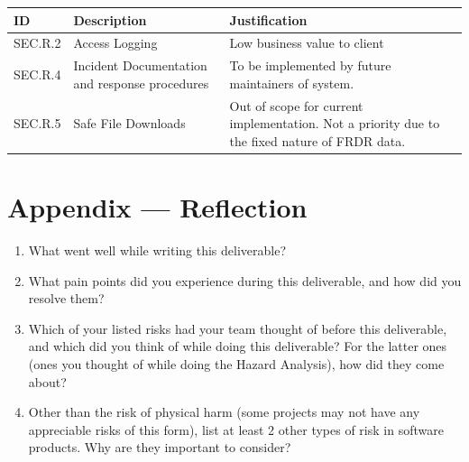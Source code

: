 \documentclass{article}
\begin{document}
\begin{table}[h!]
\begin{tabularx}{\textwidth}{ l X X } 
    \textbf{ID} & \textbf{Description} & \textbf{Justification} \\
    \hline
    SEC.R.2  & Access Logging & Low business value to client  \\
    \hline
    SEC.R.4 & Incident Documentation and response procedures & To be implemented by future maintainers of system.  \\
    \hline
        SEC.R.5 & Safe File Downloads & Out of scope for current implementation. Not a priority due to the fixed nature of FRDR data.   \\
    \hline
\end{tabularx}
\end{table}


\newpage{}

\section*{Appendix --- Reflection}




\begin{enumerate}
    \item What went well while writing this deliverable? 
    \item What pain points did you experience during this deliverable, and how
    did you resolve them?
    \item Which of your listed risks had your team thought of before this
    deliverable, and which did you think of while doing this deliverable? For
    the latter ones (ones you thought of while doing the Hazard Analysis), how
    did they come about?
    \item Other than the risk of physical harm (some projects may not have any
    appreciable risks of this form), list at least 2 other types of risk in
    software products. Why are they important to consider?
\end{enumerate}
\end{document}
